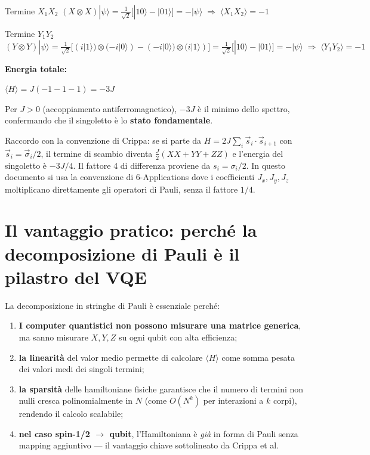 \documentclass[11pt,a4paper]{article}
\begin{document}
\begin{okbox}{Termine $X_1X_2$}
$(X\otimes X)|\psi\rangle=\frac1{\sqrt2}\big[|10\rangle-|01\rangle\big]=-|\psi\rangle
\;\Rightarrow\; \langle X_1X_2\rangle=-1$
\end{okbox}
\smallskip

\begin{okbox}{Termine $Y_1Y_2$}
$(Y\otimes Y)|\psi\rangle=\frac1{\sqrt2}\big[(i|1\rangle)\otimes(-i|0\rangle)-(-i|0\rangle)\otimes(i|1\rangle)\big]
=\frac1{\sqrt2}\big[|10\rangle-|01\rangle\big]=-|\psi\rangle
\;\Rightarrow\; \langle Y_1Y_2\rangle=-1$
\end{okbox}

\bigskip
\noindent\textbf{Energia totale:}
\begin{keyeq}
\centering
$\langle H\rangle = J(-1-1-1) = -3J$
\end{keyeq}
Per $J>0$ (accoppiamento antiferromagnetico), $-3J$ è il minimo dello
spettro, confermando che il singoletto è lo \textbf{stato fondamentale}.

\begin{editnote}
Raccordo con la convenzione di Crippa: se si parte da
$H=2J\sum_i\vec s_i\cdot\vec s_{i+1}$ con $\vec s_i=\vec\sigma_i/2$, il
termine di scambio diventa $\tfrac{J}2(XX+YY+ZZ)$ e l'energia del
singoletto è $-3J/4$. Il fattore 4 di differenza proviene da
$s_i=\sigma_i/2$. In questo documento si usa la convenzione di
6-Applications dove i coefficienti $J_x,J_y,J_z$ moltiplicano
direttamente gli operatori di Pauli, senza il fattore $1/4$.
\end{editnote}

\section{Il vantaggio pratico: perché la decomposizione di Pauli è il pilastro del VQE}

La decomposizione in stringhe di Pauli è essenziale perché:
\begin{enumerate}[leftmargin=1.4em,itemsep=0.25em]
\item \textbf{I computer quantistici non possono misurare una matrice
generica}, ma sanno misurare $X,Y,Z$ su ogni qubit con alta efficienza;
\item \textbf{la linearità} del valor medio permette di calcolare
$\langle H\rangle$ come somma pesata dei valori medi dei singoli
termini;
\item \textbf{la sparsità} delle hamiltoniane fisiche garantisce che il
numero di termini non nulli cresca polinomialmente in $N$ (come
$O(N^k)$ per interazioni a $k$ corpi), rendendo il calcolo scalabile;
\item \textbf{nel caso spin-1/2 $\to$ qubit}, l'Hamiltoniana è
\emph{già} in forma di Pauli senza mapping aggiuntivo --- il vantaggio
chiave sottolineato da Crippa et al.
\end{enumerate}
\end{document}
